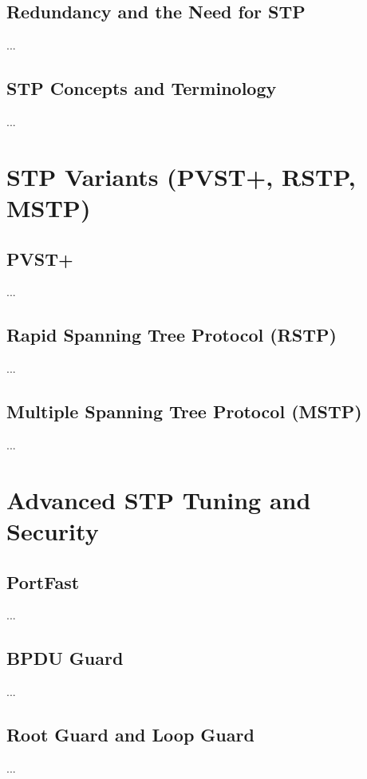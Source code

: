 \documentclass[12pt]{report}
\begin{document}
\section{Redundancy and the Need for STP}
...

\section{STP Concepts and Terminology}
...

\chapter{STP Variants (PVST+, RSTP, MSTP)}
\section{PVST+}
...

\section{Rapid Spanning Tree Protocol (RSTP)}
...

\section{Multiple Spanning Tree Protocol (MSTP)}
...

\chapter{Advanced STP Tuning and Security}
\section{PortFast}
...

\section{BPDU Guard}
...

\section{Root Guard and Loop Guard}
...

\end{document}
